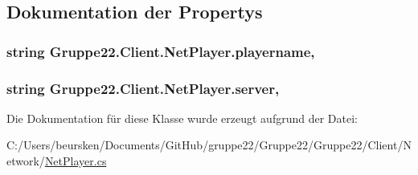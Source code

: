 \subsection{Dokumentation der Propertys}
\hypertarget{class_gruppe22_1_1_client_1_1_net_player_ad1a5e262126571468b615e44674d8be1}{
\subsubsection[{playername}]{\setlength{\rightskip}{0pt plus 5cm}string Gruppe22.\-Client.\-Net\-Player.\-playername\hspace{0.3cm}{\ttfamily [get]}, {\ttfamily [set]}}}\label{class_gruppe22_1_1_client_1_1_net_player_ad1a5e262126571468b615e44674d8be1}
\hypertarget{class_gruppe22_1_1_client_1_1_net_player_a7b62a0490b4c13e5f6c1e2dad62a1916}{
\subsubsection[{server}]{\setlength{\rightskip}{0pt plus 5cm}string Gruppe22.\-Client.\-Net\-Player.\-server\hspace{0.3cm}{\ttfamily [get]}, {\ttfamily [set]}}}\label{class_gruppe22_1_1_client_1_1_net_player_a7b62a0490b4c13e5f6c1e2dad62a1916}


Die Dokumentation für diese Klasse wurde erzeugt aufgrund der Datei\-:\begin{DoxyCompactItemize}
\item 
C\-:/\-Users/beursken/\-Documents/\-Git\-Hub/gruppe22/\-Gruppe22/\-Gruppe22/\-Client/\-Network/\hyperlink{_net_player_8cs}{Net\-Player.\-cs}\end{DoxyCompactItemize}

